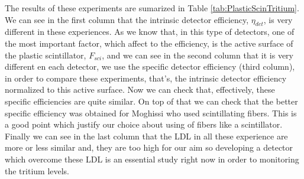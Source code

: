 
The results of these experiments are sumarized in Table \ref{tab:PlasticScinTritium}. We can see in the first column that the intrinsic detector efficiency, $\eta_{det}$, is very different in these experiences. As we know that, in this type of detectors, one of the most important factor, which affect to the efficiency, is the active surface of the plastic scintillator, $F_{sci}$, and we can see in the second column that it is very different en each detector, we use the specific detector efficiency (third column), in order to compare these experiments, that's, the intrinsic detector efficiency normalized to this active surface. Now we can check that, effectively, these specific efficiencies are quite similar. On top of that we can check that the better specific efficiency was obtained for Moghissi who used scintillating fibers. This is a good point which justify our choice about using of fibers like a scintillator. Finally we can see in the last column that the LDL in all these experience are more or less similar and, they are too high for our aim so developing a detector which overcome these LDL is an essential study right now in order to monitoring the tritium levels. 